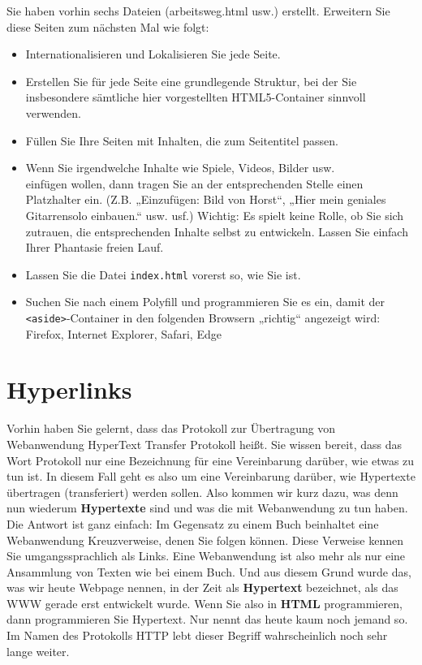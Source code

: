 Sie haben vorhin sechs Dateien (arbeitsweg.html usw.) erstellt. Erweitern Sie diese Seiten zum nächsten Mal wie folgt:

\begin{itemize}
	\item Internationalisieren und Lokalisieren Sie jede Seite.
	\item Erstellen Sie für jede Seite eine grundlegende Struktur, bei der Sie insbesondere sämtliche hier vorgestellten HTML5-Container sinnvoll verwenden.
	\item Füllen Sie Ihre Seiten mit Inhalten, die zum Seitentitel passen.
	\item Wenn Sie irgendwelche Inhalte wie Spiele, Videos, Bilder usw. \\einfügen wollen, dann tragen Sie an der entsprechenden Stelle einen Platzhalter ein. (Z.B. „Einzufügen: Bild von Horst“, „Hier mein geniales Gitarrensolo einbauen.“ usw. usf.) Wichtig: Es spielt keine Rolle, ob Sie sich zutrauen, die entsprechenden Inhalte selbst zu entwickeln. Lassen Sie einfach Ihrer Phantasie freien Lauf.
	\item Lassen Sie die Datei \verb|index.html| vorerst so, wie Sie ist.          
	\item Suchen Sie nach einem Polyfill und programmieren Sie es ein, damit der \verb|<aside>|-Container in den folgenden Browsern „richtig“ angezeigt wird: Firefox, Internet Explorer, Safari, Edge
\end{itemize}

\section{Hyperlinks}

Vorhin haben Sie gelernt, dass das Protokoll zur Übertragung von Webanwendung HyperText Transfer Protokoll heißt. Sie wissen bereit, dass das Wort Protokoll nur eine Bezeichnung für eine Vereinbarung darüber, wie etwas zu tun ist. In diesem Fall geht es also um eine Vereinbarung darüber, wie Hypertexte übertragen (transferiert) werden sollen. Also kommen wir kurz dazu, was denn nun wiederum \textbf{Hypertexte} sind und was die mit Webanwendung zu tun haben.\\

Die Antwort ist ganz einfach: Im Gegensatz zu einem Buch beinhaltet eine Webanwendung Kreuzverweise, denen Sie folgen können. Diese Verweise kennen Sie umgangssprachlich als Links. Eine Webanwendung ist also mehr als nur eine Ansammlung von Texten wie bei einem Buch. Und aus diesem Grund wurde das, was wir heute Webpage nennen, in der Zeit als \textbf{Hypertext} bezeichnet, als das WWW gerade erst entwickelt wurde. Wenn Sie also in \textbf{HTML} programmieren, dann programmieren Sie Hypertext. Nur nennt das heute kaum noch jemand so. Im Namen des Protokolls HTTP lebt dieser Begriff wahrscheinlich noch sehr lange weiter.\\


